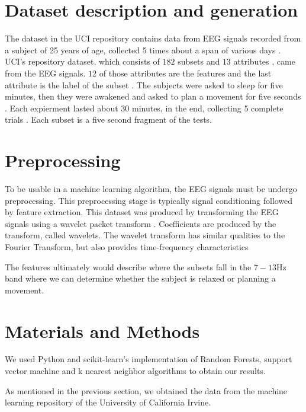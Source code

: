 \documentclass[conference,compsoc]{IEEEtran}
\begin{document}
\section{Dataset description and generation}
The dataset in the UCI repository contains data from EEG signals recorded from a subject of 25 years of age, collected 5 times about a span of various days \cite{online}.  UCI's repository dataset, which consists of $182$ subsets and $13$ attributes \cite{classsvm}, came from the EEG signals. $12$ of those attributes are the features and the last attribute is the label of the subset \cite{online}. 
The subjects were asked to sleep for five minutes, then they were awakened and asked to plan a movement for five seconds \cite{classsvm}. Each expierment lasted about 30 minutes, in the end, collecting 5 complete trials \cite{online}. Each subset is a five second fragment of the tests.

\section{Preprocessing}
To be usable in a machine learning algorithm, the EEG signals must be undergo preprocessing.  This preprocessing stage is typically signal conditioning followed by feature extraction.  This dataset was produced by transforming the EEG signals using a wavelet packet transform \cite{wavelet} . Coefficients are produced by the transform, called wavelets. The wavelet transform has similar qualities to the Fourier Transform, but also provides time-frequency characteristics%

The features ultimately would describe where the subsets fall in the $7-13\si{\hertz}$ band where we can determine whether the subject is relaxed or planning a movement.

\section{Materials and Methods}
We used Python and scikit-learn's implementation of Random Forests, support vector machine and k nearest neighbor algorithms to obtain our results.  


As mentioned in the previous section, we obtained the data from the machine learning repository of the University of California Irvine.%
\end{document}
